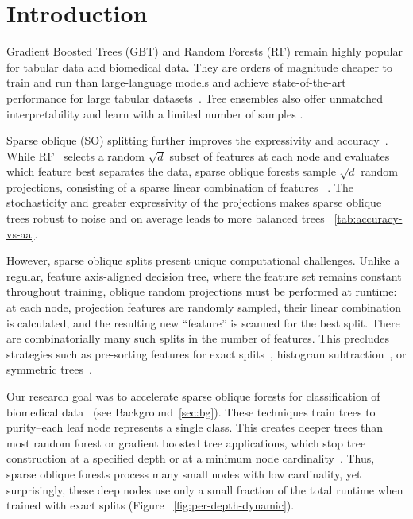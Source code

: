 \documentclass[sigconf]{acmart}
\begin{document}


\section{Introduction}

Gradient Boosted Trees (GBT) and Random Forests (RF) remain highly popular for tabular data and biomedical data. They are orders of magnitude cheaper to train and run than large-language models and achieve state-of-the-art performance for large tabular datasets~\cite{grinsztajn2022tree,shwartz2022tabular,mcelfresh2023neural}. Tree ensembles also offer unmatched interpretability and learn with a limited number of samples \cite{delgado2014}.


Sparse oblique (SO) splitting further improves the expressivity and accuracy~\cite{tomita2020sparse}. While RF~\cite{breiman} selects a random $\sqrt{d}$ subset of features at each node and evaluates which feature best separates the data, sparse oblique forests sample $\sqrt{d}$ random projections, consisting of a sparse linear combination of features ~\cite{tomita2020sparse}. The stochasticity and greater expressivity of the projections makes sparse oblique trees robust to noise and on average leads to more balanced trees~\cite{tomita2020sparse} \ref{tab:accuracy-vs-aa}.

However, sparse oblique splits present unique computational challenges. Unlike a regular, feature axis-aligned decision tree, where the feature set remains constant throughout training, oblique random projections must be performed at runtime: at each node, projection features are randomly sampled, their linear combination is calculated, and the resulting new ``feature'' is scanned for the best split. There are combinatorially many such splits in the number of features. This precludes strategies such as pre-sorting features for exact splits~\cite{ydf,wright2017ranger},
histogram subtraction~\cite{chen2016xgboost,ke2017lightgbm}, or symmetric trees~\cite{prokhorenkova2018catboost}.


Our research goal was to accelerate sparse oblique forests for classification of biomedical data~\cite{might1,might2} (see Background~\ref{sec:bg}). These techniques train trees to purity--each leaf node represents a single class. This creates deeper trees than most random forest or gradient boosted tree applications, which stop tree construction at a specified depth or at a minimum node cardinality~\cite{chen2016xgboost,prokhorenkova2018catboost}. Thus, sparse oblique forests process many small nodes with low cardinality, yet surprisingly, these deep nodes use only a small fraction of the total runtime when trained with exact splits (Figure ~\ref{fig:per-depth-dynamic}). 
\end{document}
